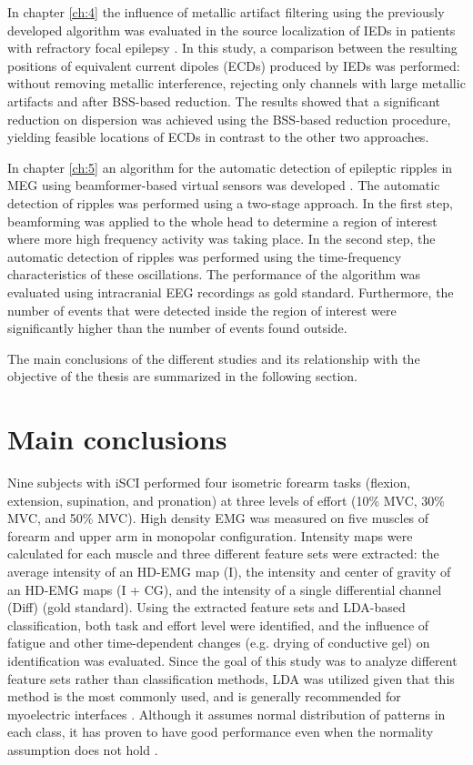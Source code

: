 In chapter \ref{ch:4} the influence of metallic artifact filtering using the previously developed algorithm was evaluated in the source localization of IEDs in patients with refractory focal epilepsy \citep{Migliorelli2016}. In this study, a comparison between the resulting positions of equivalent current dipoles (ECDs) produced by IEDs was performed: without removing metallic interference, rejecting only channels with large metallic artifacts and after BSS-based reduction. The results showed that a significant reduction on dispersion was achieved using the BSS-based reduction procedure, yielding feasible locations of ECDs in contrast to the other two approaches. 

In chapter \ref{ch:5} an algorithm for the automatic detection of epileptic ripples in MEG using beamformer-based virtual sensors was developed \citep{Migliorelli2017}. The automatic detection of ripples was performed using a two-stage approach. In the first step, beamforming was applied to the whole head to determine a region of interest where more high frequency activity was taking place. In the second step, the automatic detection of ripples was performed using the time-frequency characteristics of these oscillations. The performance of the algorithm was evaluated using intracranial EEG recordings as gold standard. Furthermore, the number of events that were detected inside the region of interest were significantly higher than the number of events found outside. 

The main conclusions of the different studies and its relationship with the objective of the thesis are summarized in the following section.

\section{Main conclusions}

Nine subjects with iSCI performed four isometric forearm tasks (flexion, extension, supination, and pronation) at three levels of effort (10\% MVC, 30\% MVC, and 50\% MVC). High density EMG was measured on five muscles of forearm and upper arm in monopolar configuration. Intensity maps were calculated for each muscle and three different feature sets were extracted: the average intensity of an HD-EMG map (I), the intensity and center of gravity of an HD-EMG maps (I + CG), and the intensity of a single differential channel (Diff) (gold standard). Using the extracted feature sets and LDA-based classification, both task and effort level were identified, and the influence of fatigue and other time-dependent changes (e.g. drying of conductive gel) on identification was evaluated. Since the goal of this study was to analyze different feature sets rather than classification methods, LDA was utilized given that this method is the most commonly used, and is generally recommended for myoelectric interfaces \citep{Hakonen2015}. Although it assumes normal distribution of patterns in each class, it has proven to have good performance even when the normality assumption does not hold \citep{Grouven1996}.

